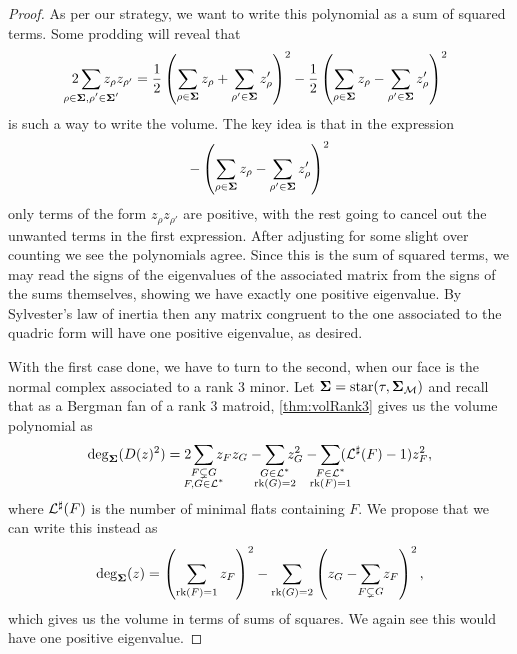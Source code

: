 \documentclass[12pt,oneside]{../../sfsuthesis}
\begin{document}
\begin{proof}
    As per our strategy, we want to write this polynomial as a sum of squared terms.
    Some prodding will reveal that
    \[
        2\sum_{\mathclap{\rho \in \bSigma, \rho' \in \bSigma'}} z_{\rho}z_{\rho'}
        = \frac{1}{2} \left( \sum_{\rho \in \bSigma} z_\rho  + \sum_{\rho' \in \bSigma} z_\rho' \right)^2 - \frac{1}{2} \left( \sum_{\rho \in \bSigma} z_\rho  - \sum_{\rho' \in \bSigma} z_\rho' \right)^2
    \]
    is such a way to write the volume.
    The key idea is that in the expression
    \[
        -\left( \sum_{\rho \in {\bm{\Sigma}}} z_\rho  - \sum_{\rho' \in {\bm{\Sigma}}} z_\rho' \right)^2
    \]
    only terms of the form \( z_\rho z_{\rho'} \) are positive, with the rest going to cancel out the unwanted terms in the first expression.
    After adjusting for some slight over counting we see the polynomials agree.
    Since this is the sum of squared terms, we may read the signs of the eigenvalues of the associated matrix from the signs of the sums themselves, showing we have exactly one positive eigenvalue.
    By Sylvester's law of inertia then any matrix congruent to the one associated to the quadric form will have one positive eigenvalue, as desired.

    With the first case done, we have to turn to the second, when our face is the normal complex associated to a rank 3 minor.
    Let \( {\bm{\Sigma}} = \operatorname{star}(\tau, {\bm{\Sigma}}_{\mathcal{M}})  \) and recall that as a Bergman fan of a rank 3 matroid, \th\ref{thm:volRank3} gives us the volume polynomial as
    \[
        \deg_\bSigma(D(z)^2) =  2\sum_{\mathclap{\substack{F \subsetneq G \\ F,G \in \cL^\ast}}} z_F z_G - \sum_{\mathclap{\substack{G \in \cL^\ast \\ \rk(G)=2}}} z_G^2 - \sum_{\mathclap{\substack{F \in \cL^\ast \\ \rk(F)=1}}}(\cL^\sharp(F) - 1)z_F^2,
    \]
    where \( \mathcal{L}^\sharp(F) \) is the number of minimal flats containing \( F \).
    We propose that we can write this instead as
    \[
        \deg_\bSigma(z) = \left( \sum_{\rk(F) = 1} z_F\right)^2 - \sum_{\substack{\rk(G) = 2}} \left( z_G - \sum_{\mathclap{\substack{F \subsetneq G }}} z_F\right)^2,
    \]
    which gives us the volume in terms of sums of squares.
    We again see this would have one positive eigenvalue.


\end{proof}
\end{document}
